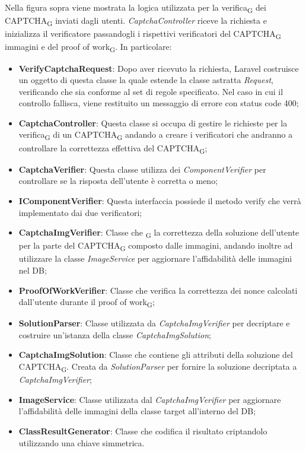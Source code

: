 Nella figura sopra viene mostrata la logica utilizzata per la verifica\textsubscript{G} dei CAPTCHA\textsubscript{G} inviati dagli utenti. \textit{CaptchaController} riceve la richiesta e inizializza il verificatore passandogli i rispettivi verificatori del CAPTCHA\textsubscript{G} immagini e del proof of work\textsubscript{G}.
In particolare:
\begin{itemize}
	\item \textbf{VerifyCaptchaRequest}: Dopo aver ricevuto la richiesta, Laravel costruisce un oggetto di questa classe la quale estende la classe astratta \textit{Request}, verificando che sia conforme al set di regole specificato. Nel caso in cui il controllo fallisca, viene restituito un messaggio di errore con status code 400;
	\item \textbf{CaptchaController}: Questa classe si occupa di gestire le richieste per la verifica\textsubscript{G} di un CAPTCHA\textsubscript{G} andando a creare i verificatori che andranno a controllare la correttezza effettiva del CAPTCHA\textsubscript{G};
	\item \textbf{CaptchaVerifier}: Questa classe utilizza dei \textit{ComponentVerifier} per controllare se la risposta dell'utente è corretta o meno;
	\item \textbf{IComponentVerifier}: Questa interfaccia possiede il metodo verify che verrà implementato dai due verificatori; 
	\item \textbf{CaptchaImgVerifier}: Classe che \textsubscript{G} la correttezza della soluzione dell'utente per la parte del CAPTCHA\textsubscript{G} composto dalle immagini, andando inoltre ad utilizzare la classe \textit{ImageService} per aggiornare l'affidabilità delle immagini nel DB;
	\item \textbf{ProofOfWorkVerifier}: Classe che verifica la correttezza dei nonce calcolati dall'utente durante il proof of work\textsubscript{G};
	\item \textbf{SolutionParser}: Classe utilizzata da \textit{CaptchaImgVerifier} per decriptare e costruire un'istanza della classe \textit{CaptchaImgSolution};
	\item \textbf{CaptchaImgSolution}: Classe che contiene gli attributi della soluzione del CAPTCHA\textsubscript{G}. Creata da \textit{SolutionParser} per fornire la soluzione decriptata a \textit{CaptchaImgVerifier};
	\item \textbf{ImageService}: Classe utilizzata dal \textit{CaptchaImgVerifier} per aggiornare l'affidabilità delle immagini della classe target all'interno del DB;
	\item \textbf{ClassResultGenerator}: Classe che codifica il risultato criptandolo utilizzando una chiave simmetrica.
\end{itemize}

